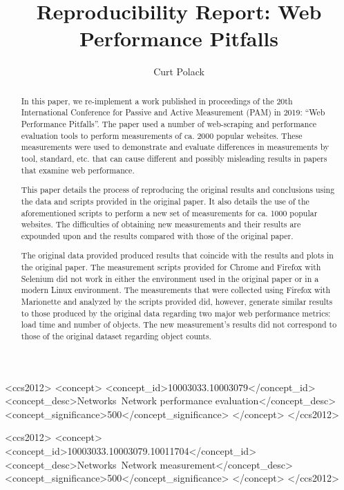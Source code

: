 \documentclass[sigconf]{acmart}
\begin{document}
\title{Reproducibility Report: Web Performance Pitfalls}

\author{Curt Polack}

\begin{abstract}
	In this paper, we re-implement a work published in proceedings of the 20th International Conference for Passive and Active Measurement (PAM) in 2019: ``Web Performance Pitfalls''. The paper used a number of web-scraping and performance evaluation tools to perform measurements of ca. 2000 popular websites. These measurements were used to demonstrate and evaluate differences in measurements by tool, standard, etc. that can cause different and possibly misleading results in papers that examine web performance.
	
	This paper details the process of reproducing the original results and conclusions using the data and scripts provided in the original paper. It also details the use of the aforementioned scripts to perform a new set of measurements for ca. 1000 popular websites. The difficulties of obtaining new measurements and their results are expounded upon and the results compared with those of the original paper.
	
	The original data provided produced results that coincide with the results and plots in the original paper. The measurement scripts provided for Chrome and Firefox with Selenium did not work in either the environment used in the original paper or in a modern Linux environment. The measurements that were collected using Firefox with Marionette and analyzed by the scripts provided did, however, generate similar results to those produced by the original data regarding two major web performance metrics: load time and number of objects. The new measurement's results did not correspond to those of the original dataset regarding object counts. 
\end{abstract}

\begin{CCSXML}
<ccs2012>
	<concept>
	<concept_id>10003033.10003079</concept_id>
	<concept_desc>Networks~Network performance evaluation</concept_desc>
	<concept_significance>500</concept_significance>
	</concept>
</ccs2012>
\end{CCSXML}

\begin{CCSXML}
<ccs2012>
	<concept>
	<concept_id>10003033.10003079.10011704</concept_id>
	<concept_desc>Networks~Network measurement</concept_desc>
	<concept_significance>500</concept_significance>
	</concept>
</ccs2012>
\end{CCSXML}
\end{document}
